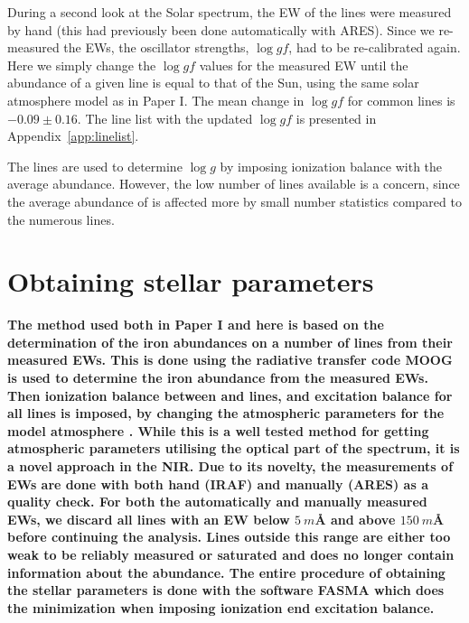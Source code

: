 \documentclass{aa}
\begin{document}
During a second look at the Solar spectrum, the EW of the lines were measured by
hand (this had previously been done automatically with ARES). Since we
re-measured the EWs, the oscillator strengths, $\log \mathit{gf}$, had to be
re-calibrated again. Here we simply change the $\log \mathit{gf}$ values for the
measured EW until the abundance of a given line is equal to that of the Sun,
using the same solar atmosphere model as in Paper I. The mean change in $\log
\mathit{gf}$ for common lines is $-0.09 \pm 0.16$. The line list with the
updated $\log \mathit{gf}$ is presented in Appendix~\ref{app:linelist}.

The  lines are used to determine $\log g$ by imposing ionization
balance with the average  abundance. However, the low number of
 lines available is a concern, since the average abundance of
 is affected more by small number statistics compared to the
numerous  lines.


\section{Obtaining stellar parameters}
\label{sec:method}

{\bf The method used both in Paper I and here is based on the determination of
the iron abundances on a number of lines from their measured EWs. This is done
using the radiative transfer code MOOG \citep{Sneden1973} is used to determine
the iron abundance from the measured EWs. Then ionization balance between
 and  lines, and excitation balance for all 
lines is imposed, by changing the atmospheric parameters for the model
atmosphere \citep[][is used here]{Kurucz1993}. While this is a well tested
method for getting atmospheric parameters utilising the optical part of the
spectrum, it is a novel approach in the NIR. Due to its novelty, the
measurements of EWs are done with both hand (IRAF) and manually (ARES) as a
quality check. For both the automatically and manually measured EWs, we discard
all lines with an EW below $\SI{5}{m}$\AA{} and above $\SI{150}{m}$\AA{} before
continuing the analysis. Lines outside this range are either too weak to be
reliably measured or saturated and does no longer contain information about the
abundance. The entire procedure of obtaining the stellar parameters is done with
the software FASMA \citep{Andreasen2017a} which does the minimization when
imposing ionization end excitation balance.}
\end{document}
